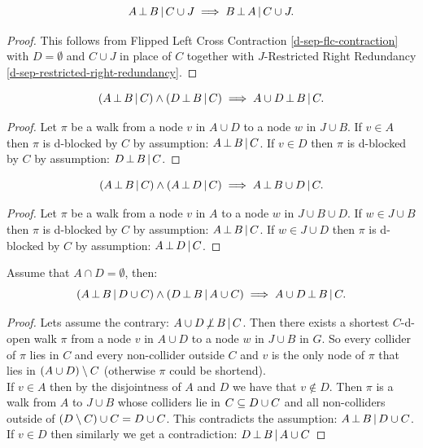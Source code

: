 \begin{Lem}
    \[A \operatorname*{\perp}  B \operatorname*{|} C \cup J \implies B \operatorname*{\perp} A \operatorname*{|} C \cup J.\]
\begin{proof}
    This follows from Flipped Left Cross Contraction \ref{d-sep-flc-contraction} with $D=\emptyset$ and $C \cup J$ in place of $C$ together with
    $J$-Restricted Right Redundancy \ref{d-sep-restricted-right-redundancy}.
\end{proof}
\end{Lem}


\begin{Lem}
    \[ (A \operatorname*{\perp}  B \operatorname*{|}  C) \land (D \operatorname*{\perp}  B \operatorname*{|} C) \implies A \cup D \operatorname*{\perp}  B \operatorname*{|} C.\]
\begin{proof}
    Let $\pi$ be a walk from a node $v$ in $A \cup D$ to a node $w$ in $J \cup B$.
    If $v \in A$ then $\pi$ is d-blocked by $C$ by assumption: $A \operatorname*{\perp}  B \operatorname*{|}  C$.
    If $v \in D$ then $\pi$ is d-blocked by $C$ by assumption: $D \operatorname*{\perp}  B \operatorname*{|}  C$.
\end{proof}
\end{Lem}

\begin{Lem}
    \[ (A \operatorname*{\perp}  B \operatorname*{|}  C) \land (A \operatorname*{\perp}  D \operatorname*{|} C) \implies A \operatorname*{\perp}  B \cup  D \operatorname*{|} C.\]
\begin{proof}
    Let $\pi$ be a walk from a node $v$ in $A$ to a node $w$ in  $J \cup B \cup D$.
    If $w \in J \cup B$ then $\pi$ is d-blocked by $C$ by assumption: $A \operatorname*{\perp}  B \operatorname*{|}  C$.
    If $w \in J \cup D$ then $\pi$ is d-blocked by $C$ by assumption: $A \operatorname*{\perp}  D \operatorname*{|}  C$.
\end{proof}
\end{Lem}

\begin{Lem} Assume that $A \cap D = \emptyset$, then:
    \[ (A \operatorname*{\perp}  B \operatorname*{|} D \cup  C) \land (D \operatorname*{\perp}  B \operatorname*{|} A \cup C) \implies A \cup D \operatorname*{\perp}  B \operatorname*{|}   C.\]
\begin{proof}
    Lets assume the contrary:  $A \cup D \operatorname*{\not\perp}  B \operatorname*{|} C$.
    Then there exists a shortest $C$-d-open walk $\pi$ 
    from a node $v$ in $A \cup D$ to a node $w$ in $J \cup B $ in $G$.
    So every collider of $\pi$ lies in $C$ and every non-collider outside $C$ and $v$ is 
    the only node of $\pi$ that lies in $(A \cup D)\setminus C$ (otherwise $\pi$ could be shortend). \\
    If $v \in A$ then by the disjointness of $A$ and $D$ we have that $v \notin D$. 
    Then $\pi$ is a walk from $A$ to $J \cup B$ whose colliders lie in $C \subseteq D \cup C$ 
    and all non-colliders outside of $(D \setminus C) \cup C =D \cup C$. This contradicts the assumption: $A \operatorname*{\perp}  B \operatorname*{|} D \cup  C$.\\
    If $v \in D$ then similarly we get a contradiction: $D \operatorname*{\perp}  B \operatorname*{|} A \cup  C$
\end{proof}
\end{Lem}

